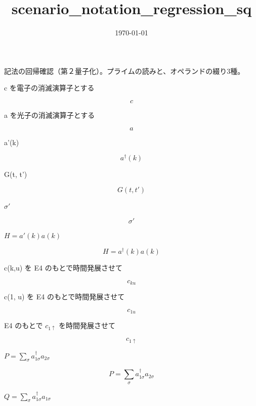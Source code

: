 \documentclass[dvipdfmx,a4paper,11pt]{jsarticle}
\title{scenario\_notation\_regression\_sq}
\date{\today}
\begin{document}
\maketitle

記法の回帰確認（第２量子化）。プライムの読みと、オペランドの綴り3種。

c を電子の消滅演算子とする

\[
  c
\]

a を光子の消滅演算子とする

\[
  a
\]

a'(k)

\begin{equation}
  a^{\dagger}(k)
  \label{eq:E1}
\end{equation}

G(t, t')

\begin{equation}
  G(t, t')
  \label{eq:E2}
\end{equation}

$\sigma'$

\begin{equation}
  \sigma'
  \label{eq:E3}
\end{equation}

$H = a'(k) a(k)$

\begin{equation}
  H = a^{\dagger}(k) a(k)
  \label{eq:E4}
\end{equation}

c(k,u) を E4 のもとで時間発展させて

\begin{equation}
  c_{ku}
  \label{eq:E5}
\end{equation}

c(1, u) を E4 のもとで時間発展させて

\begin{equation}
  c_{1u}
  \label{eq:E6}
\end{equation}

E4 のもとで $c_{1\uparrow}$ を時間発展させて

\begin{equation}
  c_{1\uparrow}
  \label{eq:E7}
\end{equation}

$P = \sum_\sigma a^\dagger_{1\sigma} a_{2\sigma}$

\begin{equation}
  P = \sum_\sigma a^\dagger_{1\sigma} a_{2\sigma}
  \label{eq:E8}
\end{equation}

$Q = \sum_\sigma a^\dagger_{1\sigma} a_{1\sigma}$
\end{document}
